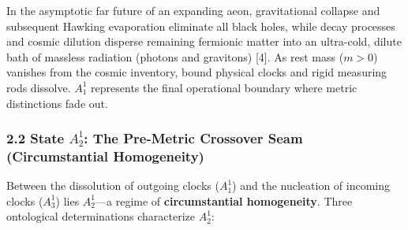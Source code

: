 \documentclass[
]{article}
\begin{document}
In the asymptotic far future of an expanding aeon, gravitational
collapse and subsequent Hawking evaporation eliminate all black holes,
while decay processes and cosmic dilution disperse remaining fermionic
matter into an ultra-cold, dilute bath of massless radiation (photons
and gravitons) {[}4{]}. As rest mass (\(m > 0\)) vanishes from the
cosmic inventory, bound physical clocks and rigid measuring rods
dissolve. \(A_1^1\) represents the final operational boundary where
metric distinctions fade out.

\subsubsection{\texorpdfstring{2.2 State \(A_2^1\): The Pre-Metric
Crossover Seam (Circumstantial
Homogeneity)}{2.2 State A\_2\^{}1: The Pre-Metric Crossover Seam (Circumstantial Homogeneity)}}\label{state-a_21-the-pre-metric-crossover-seam-circumstantial-homogeneity}

Between the dissolution of outgoing clocks (\(A_1^1\)) and the
nucleation of incoming clocks (\(A_3^1\)) lies \(A_2^1\)---a regime of
\textbf{circumstantial homogeneity}. Three ontological determinations
characterize \(A_2^1\):
\end{document}
